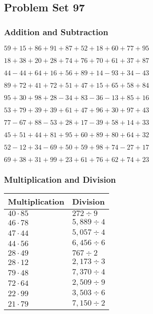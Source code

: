 \hypertarget{problem-set-97}{%
\subsection{Problem Set 97}\label{problem-set-97}}

\hypertarget{addition-and-subtraction}{%
\subsubsection{Addition and
Subtraction}\label{addition-and-subtraction}}

\(59+15+86+91+87+52+18+60+77+95\)

\(18+38+20+28+74+76+70+61+37+87\)

\(44-44+64+16+56+89+14-93+34-43\)

\(89+72+41+72+51+47+15+65+58+84\)

\(95+30+98+28-34+83-36-13+85+16\)

\(53+79+39+39+61+47+96+30+97+43\)

\(77-67+88-53+28+17-39+58+14+33\)

\(45+51+44+81+95+60+89+80+64+32\)

\(52-12+34-69+50+59+98+74-27+17\)

\(69+38+31+99+23+61+76+62+74+23\)

\hypertarget{multiplication-and-division}{%
\subsubsection{Multiplication and
Division}\label{multiplication-and-division}}

\begin{longtable}[]{@{}ll@{}}
\toprule
Multiplication & Division\tabularnewline
\midrule
\endhead
\(40\cdot85\) & \(272 ÷9\)\tabularnewline
\(46\cdot78\) & \(5,889÷4\)\tabularnewline
\(47\cdot44\) & \(5,057÷4\)\tabularnewline
\(44\cdot56\) & \(6,456÷6\)\tabularnewline
\(28\cdot49\) & \(767÷2\)\tabularnewline
\(28\cdot12\) & \(2,173÷3\)\tabularnewline
\(79\cdot48\) & \(7,370÷4\)\tabularnewline
\(72\cdot64\) & \(2,509÷9\)\tabularnewline
\(22\cdot99\) & \(3,503÷6\)\tabularnewline
\(21\cdot79\) & \(7,150÷2\)\tabularnewline
\bottomrule
\end{longtable}
